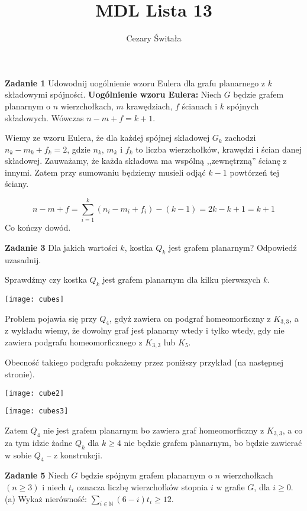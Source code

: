 \documentclass[12pt,a4paper]{article}
\title{MDL Lista 13}
\author{Cezary Świtała}
\begin{document}
\maketitle

\noindent
\textbf{Zadanie 1} Udowodnij uogólnienie wzoru Eulera dla grafu planarnego z \(k\) składowymi spójności.
\vskip 0.2cm
\textbf{Uogólnienie wzoru Eulera:} Niech \(G\) będzie grafem planarnym o \(n\) wierzchołkach, \(m\) krawędziach, \(f\) ścianach i \(k\) spójnych składowych. Wówczas \(n - m + f = k+1\).

Wiemy ze wzoru Eulera, że dla każdej spójnej składowej \(G_k\) zachodzi \(n_k - m_k + f_k = 2\), gdzie \(n_k\), \(m_k\) i \(f_k\) to liczba wierzchołków, krawędzi i ścian danej składowej. Zauważamy, że każda składowa ma wspólną ,,zewnętrzną'' ścianę z innymi. Zatem przy sumowaniu będziemy musieli odjąć \(k-1\) powtórzeń tej ściany.

\[
	n - m + f = \sum_{i=1}^k (n_i - m_i + f_i) - (k-1) = 2k - k + 1 = k+1
\]
Co kończy dowód.

\vskip 1cm
\noindent
\textbf{Zadanie 3} Dla jakich wartości \(k\), kostka \(Q_k\) jest grafem planarnym? Odpowiedź uzasadnij.
\vskip 0.2cm

Sprawdźmy czy kostka \(Q_k\) jest grafem planarnym dla kilku pierwszych \(k\). 
\begin{center}
	\texttt{[image: cubes]}
\end{center}
Problem pojawia się przy \(Q_4\), gdyż zawiera on podgraf homeomorficzny z \(K_{3,3}\), a z wykładu wiemy, że dowolny graf jest planarny wtedy i tylko wtedy, gdy nie zawiera podgrafu homeomorficznego  z \( K_{3,3} \) lub \(K_5\).

Obecność takiego podgrafu pokażemy przez poniższy przykład (na następnej stronie).

\begin{center}
	\texttt{[image: cube2]}
	
\end{center}
\begin{center}
	\texttt{[image: cubes3]}
\end{center}
Zatem \(Q_4\) nie jest grafem planarnym bo zawiera graf homeomorficzny z \(K_{3,3}\), a co za tym idzie żadne \(Q_k\) dla \( k \geq 4\) nie będzie grafem planarnym, bo będzie zawierać w sobie \(Q_4\) -- z konstrukcji.

\newpage
\noindent
\textbf{Zadanie 5} Niech \(G\) będzie spójnym grafem planarnym o \(n\) wierzchołkach \( (n \geq 3) \) i niech \(t_i\) oznacza liczbę wierzchołków stopnia \(i\) w grafie \(G\), dla \( i \geq 0 \).
\vskip 0.2cm
(a) Wykaż nierówność: \( \sum_{i \in \mathbb{N}} (6- i)t_i \geq 12 \).
\end{document}

